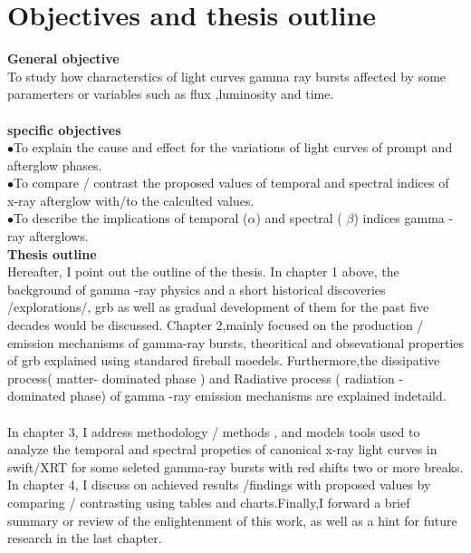 \section{Objectives and thesis outline}
\textbf{General objective}\\
 To study how characterstics of light curves gamma ray bursts affected by some  paramerters or variables such as flux ,luminosity and  time.\\\\   
\textbf{specific objectives}\\
$\bullet$To explain the  cause and effect  for the  variations of light curves of  prompt and afterglow phases.\\
$\bullet$To compare / contrast the proposed values of temporal and spectral  indices of x-ray afterglow with/to the calculted values.\\
$\bullet$To describe the implications of  temporal ($\alpha$) and spectral ( $ \beta $) indices gamma -ray afterglows.\\
\textbf{Thesis outline}\\
 Hereafter, I point out the outline of the thesis. In chapter 1 above, the  background of gamma -ray physics  and a short historical discoveries /explorations/, grb as well as  gradual development of them for the past  five decades would be discussed. Chapter 2,mainly focused on the production  /  emission mechanisms of gamma-ray bursts,  theoritical and obsevational properties of grb explained using standared fireball moedels. Furthermore,the  dissipative process( matter- dominated phase ) and Radiative process ( radiation - dominated phase) of gamma -ray emission  mechanisms are  explained indetaild.\\\\
In chapter 3, I address  methodology / methods , and  models tools  used to analyze the temporal and spectral propeties of canonical x-ray light curves in swift/XRT for some seleted gamma-ray bursts with red shifts two or more breaks.
In chapter 4, I discuss on achieved results /findings  with proposed values by comparing / contrasting  using tables and charts.Finally,I forward  a brief summary or review of the enlightenment of this work, as well as a hint for future research in the last chapter. 
